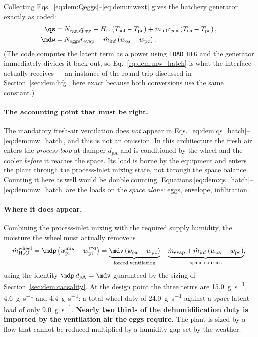 Collecting Eqs.~\eqref{eq:dem:Qeggs}--\eqref{eq:dem:mwext} gives the hatchery
generator exactly as coded:
\begin{align}
\qs&=N_{\mathrm{eggs}}q_{\mathrm{egg}}
+H_{\mathrm{tr}}\left(T_{\mathrm{sol}}-T_{\mathrm{pc}}\right)
+\dot m_{\mathrm{inf}}c_{p,\mathrm{a}}\left(T_{\mathrm{oa}}-T_{\mathrm{pc}}\right),
\label{eq:dem:qs_hatch}\\
\mdw&=N_{\mathrm{eggs}}r_{\mathrm{evap}}
+\dot m_{\mathrm{inf}}\left(w_{\mathrm{oa}}-w_{\mathrm{pc}}\right).
\label{eq:dem:mw_hatch}
\end{align}
(The code computes the latent term as a power using \verb|LOAD_HFG| and the
generator immediately divides it back out, so Eq.~\eqref{eq:dem:mw_hatch} is what
the interface actually receives --- an instance of the round trip discussed in
Section~\ref{sec:dem:hfg}, here exact because both conversions use the same
constant.)

\paragraph{The accounting point that must be right.} The mandatory fresh-air
ventilation does \emph{not} appear in
Eqs.~\eqref{eq:dem:qs_hatch}--\eqref{eq:dem:mw_hatch}, and this is not an
omission. In this architecture the fresh air enters the \emph{process loop} at
damper $d_{p\mathrm{A}}$ and is conditioned by the wheel and the cooler
\emph{before} it reaches the space. Its load is borne by the equipment and enters
the plant through the process-inlet mixing state, not through the space balance.
Counting it here as well would be double counting. Equations
\eqref{eq:dem:qs_hatch}--\eqref{eq:dem:mw_hatch} are the loads on the \emph{space
alone}: eggs, envelope, infiltration.

\paragraph{Where it does appear.} Combining the process-inlet mixing with the
required supply humidity, the moisture the wheel must actually remove is
\begin{equation}
\dot m_{\mathrm{H_2O}}^{\mathrm{wheel}}
=\mdp\left(w_{\mathrm{pi}}^{\mathrm{mix}}-w_{\mathrm{pi}}^{\mathrm{req}}\right)
=\underbrace{\mdv\left(w_{\mathrm{oa}}-w_{\mathrm{pc}}\right)}_{\text{forced ventilation}}
+\underbrace{\dot m_{\mathrm{evap}}
+\dot m_{\mathrm{inf}}\left(w_{\mathrm{oa}}-w_{\mathrm{pc}}\right)}_{\text{space sources}},
\label{eq:dem:trueduty}
\end{equation}
using the identity $\mdp\,d_{p\mathrm{A}}=\mdv$ guaranteed by the sizing of
Section~\ref{sec:dem:causality}. At the design point the three terms are
\SI{15.0}{\gram\per\second}, \SI{4.6}{\gram\per\second} and
\SI{4.4}{\gram\per\second}: a total wheel duty of
\SI{24.0}{\gram\per\second} against a \emph{space} latent load of only
\SI{9.0}{\gram\per\second}. \textbf{Nearly two thirds of the dehumidification
duty is imported by the ventilation air the eggs require.} The plant is sized by
a flow that cannot be reduced multiplied by a humidity gap set by the weather.

